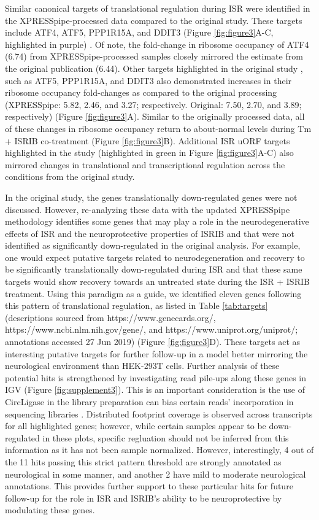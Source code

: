 \documentclass[11pt, a4paper, oneside]{article}
\begin{document}
Similar canonical targets of translational regulation during ISR were identified in the XPRESSpipe-processed data compared to the original study. These targets include ATF4, ATF5, PPP1R15A, and DDIT3 (Figure \ref{fig:figure3}A-C, highlighted in purple) \cite{isrib_riboseq}. Of note, the fold-change in ribosome occupancy of ATF4 (6.74) from XPRESSpipe-processed samples closely mirrored the estimate from the original publication (6.44). Other targets highlighted in the original study \cite{isrib_riboseq}, such as ATF5, PPP1R15A, and DDIT3 also demonstrated increases in their ribosome occupancy fold-changes as compared to the original processing (XPRESSpipe: 5.82, 2.46, and 3.27; respectively. Original: 7.50, 2.70, and 3.89; respectively) (Figure \ref{fig:figure3}A). Similar to the originally processed data, all of these changes in ribosome occupancy return to about-normal levels during Tm + ISRIB co-treatment (Figure \ref{fig:figure3}B). Additional ISR uORF targets highlighted in the study (highlighted in green in Figure \ref{fig:figure3}A-C) also mirrored changes in translational and transcriptional regulation across the conditions from the original study. \par

In the original study, the genes translationally down-regulated genes were not discussed. However, re-analyzing these data with the updated XPRESSpipe methodology identifies some genes that may play a role in the neurodegenerative effects of ISR and the neuroprotective properties of ISRIB and that were not identified as significantly down-regulated in the original analysis. For example, one would expect putative targets related to neurodegeneration and recovery to be significantly translationally down-regulated during ISR and that these same targets would show recovery towards an untreated state during the ISR + ISRIB treatment. Using this paradigm as a guide, we identified eleven genes following this pattern of translational regulation, as listed in Table \ref{tab:targets} (descriptions sourced from https://www.genecards.org/, https://www.ncbi.nlm.nih.gov/gene/, and https://www.uniprot.org/uniprot/; annotations accessed 27 Jun 2019) (Figure \ref{fig:figure3}D). These targets act as interesting putative targets for further follow-up in a model better mirroring the neurological environment than HEK-293T cells. Further analysis of these potential hits is strengthened by investigating read pile-ups along these genes in IGV \cite{igv} (Figure \ref{fig:supplement3}). This is an important consideration is the use of CircLigase in the library preparation can bias certain reads' incorporation in sequencing libraries \cite{circligase_bias}. Distributed footprint coverage is observed across transcripts for all highlighted genes; however, while certain samples appear to be down-regulated in these plots, specific regluation should not be inferred from this information as it has not been sample normalized. However, interestingly, 4 out of the 11 hits passing this strict pattern threshold are strongly annotated as neurological in some manner, and another 2 have mild to moderate neurological annotations. This provides further support to these particular hits for future follow-up for the role in ISR and ISRIB's ability to be neuroprotective by modulating these genes.
\end{document}
